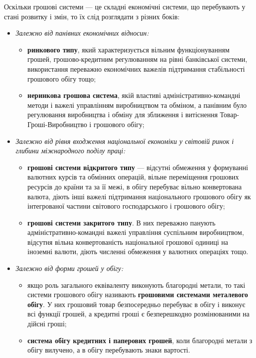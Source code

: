 \documentclass[a4paper,12pt,notitlepage,pdftex,headsepline]{scrartcl}
\begin{document}
  Оскільки грошові системи --- це складні економічні системи, що перебувають у стані
  розвитку і змін, то їх слід розглядати з різних боків:
  \begin{itemize}
    \item \textit{Залежно від панівних економічних відносин:}
      \begin{itemize}
        \item \textbf{ринкового типу}, який характеризується вільним функціонуванням грошей,
          грошово-кредитним регулюванням на рівні банківської системи, використання
          переважно економічних важелів підтримання стабільності грошового обігу тощо;
        \item \textbf{неринкова грошова система}, якій властиві адміністративно-командні
          методи і важелі управлінням виробництвом та обміном, а панівним було регулювання
          виробництва і обміну для зближення і витіснення Товар-Гроші-Виробництво і
          грошового обігу;
      \end{itemize}
    \item \textit{Залежно від рівня входження національної економіки у світовій ринок і
                  глибини міжнародного поділу праці:}
      \begin{itemize}
        \item \textbf{грошові системи відкритого типу} --- відсутні обмеження у формуванні
          валютних курсів та обмінних операцій, вільне переміщення грошових ресурсів до
          країни та за її межі, в обігу перебуває вільно конвертована валюта, діють інші
          важелі підтримання національного грошового обігу як інтегрованої частини світового
          господарського і грошового обігу;
        \item \textbf{грошові системи закритого типу}.
          В них переважно панують адміністративно-командні важелі управління суспільним
          виробництвом, відсутня вільна конвертованість національної грошової одиниці на
          іноземні валюти, діють численні обмеження у валютних операціях тощо.
      \end{itemize}
    \item \textit{Залежно від форми грошей у обігу:}
      \begin{itemize}
        \item якщо роль загального еквіваленту виконують благородні метали, то такі системи
          грошового обігу називають \textbf{грошовими системами металевого обігу}.
          У них грошовий товар безпосередньо перебуває в обігу і виконує всі функції грошей,
          а кредитні гроші є безперешкодно розмінюваними на дійсні гроші;
        \item \textbf{система обігу кредитних і паперових грошей}, коли благородні метали з
          обігу вилучено, а в обігу перебувають знаки вартості.
      \end{itemize}
  \end{itemize}
\end{document}
